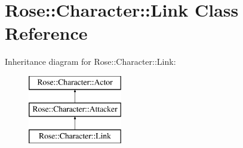 \hypertarget{classRose_1_1Character_1_1Link}{}\section{Rose\+::Character\+::Link Class Reference}
\label{classRose_1_1Character_1_1Link}
Inheritance diagram for Rose\+::Character\+::Link\+:\begin{figure}[H]
\begin{center}
\leavevmode
\includegraphics[height=3.000000cm]{classRose_1_1Character_1_1Link}
\end{center}
\end{figure}
